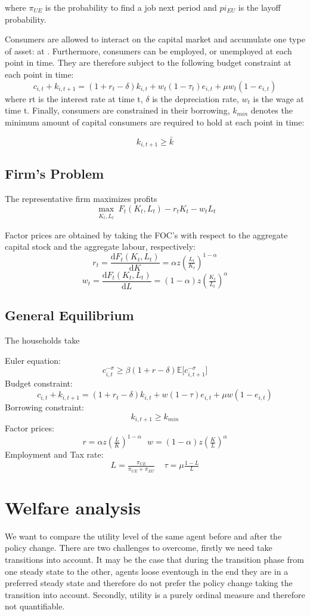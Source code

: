 \documentclass[a4paper,12pt]{article}
\begin{document}
where $\pi_{UE}$ is the probability to find a job next period and $pi_{EU}$ is the layoff probability. 



Consumers are allowed to interact on the capital market and accumulate one type of asset: at . Furthermore, consumers can be employed, or unemployed at each point in time. They are therefore subject to the following budget constraint at each point in time: 
  \[ 
  c_{i,t} + k_{i,t+1} = (1 + r_{t} - \delta) k_{i,t} + w_{t} (1 - \tau_{t})  e_{i,t} + \mu w_{t} (1 - e_{i,t})
  \]
 where rt is the interest rate at time t, $\delta$ is the depreciation rate, $w_{t}$ is the wage at time t. 
Finally, consumers are constrained in their borrowing, $k_{min}$ denotes the minimum amount of capital consumers are required to hold at each point in time: 

   \[
   k_{i,t + 1} \geq \bar{k}
 	\]
	
\subsection{Firm's Problem}

The representative firm maximizes profits 
\[ \max_{\substack{K_{t},L_{t}}}F_{t}(K_{t},L_{t})-r_{t}K_{t}-w_{t}L_{t}
\]

Factor prices are obtained by taking the FOC's with respect to the aggregate capital stock and the aggregate labour, respectively: 
\[
r_{t} = \frac{\mathrm d F_{t}(K_{t},L_{t})}{\mathrm d K} = \alpha z (\tfrac{L_{t}}{K_{t}})^{1-\alpha} \]
\[
w_{t} = \frac{\mathrm d F_{t}(K_{t},L_{t})}{\mathrm d L} =(1-\alpha)z (\tfrac{K_{t}}{L_{t}})^{\alpha}
\]

\subsection{General Equilibrium}

The households take 

Euler equation:
\[ 
c_{i,t}^{- \sigma} \geq \beta (1+r -\delta){\mathbb{E}[c_{i,t+1}^{- \sigma}}]
\]
Budget constraint:
 \[ 
 c_{i,t} + k_{i,t+1} = (1 + r_{t} - \delta) k_{i,t} + w (1 - \tau)  e_{i,t} + \mu w (1 - e_{i,t})
 \]
Borrowing constraint:
  \[
  k_{i,t + 1} \geq k_{min}
	\]
Factor prices:
\[
r = \alpha z (\tfrac{L}{K})^{1-\alpha} \ \ \ w = (1-\alpha)z (\tfrac{K}{L})^{\alpha}
\]
Employment and Tax rate: 
\[
L = \tfrac{\pi_{UE}}{\pi_{UE}+\pi_{EU}} \ \ \ \ \  \tau = \mu \tfrac{1-L}{L}
\]
\section{Welfare analysis}
We want to compare the utility level of the same agent before and after the policy change. There are two challenges to overcome, firstly we need take transitions into account. It may be the case that during the transition phase from one steady state to the other, agents loose eventough in the end they are in a preferred steady state and therefore do not prefer the policy change taking the transition into account. Secondly, utility is a purely ordinal measure and therefore not quantifiable. 
\end{document}
